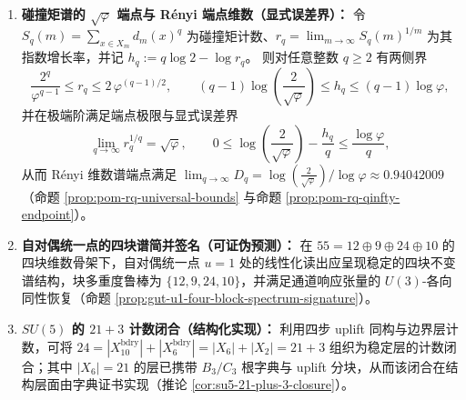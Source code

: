 \begin{theorem}
\begin{enumerate}
  \item \textbf{碰撞矩谱的 \texorpdfstring{$\sqrt{\varphi}$}{sqrt(phi)} 端点与 Rényi 端点维数（显式误差界）：}
  令 \(S_q(m)=\sum_{x\in X_m}d_m(x)^q\) 为碰撞矩计数、\(r_q=\lim_{m\to\infty}S_q(m)^{1/m}\) 为其指数增长率，并记 \(h_q:=q\log 2-\log r_q\)。
  则对任意整数 \(q\ge 2\) 有两侧界
  \[
  \frac{2^q}{\varphi^{q-1}}\le r_q\le 2\,\varphi^{(q-1)/2},
  \qquad
  (q-1)\log\!\left(\frac{2}{\sqrt{\varphi}}\right)\le h_q\le (q-1)\log\varphi,
  \]
  并在极端阶满足端点极限与显式误差界
  \[
  \lim_{q\to\infty} r_q^{1/q}=\sqrt{\varphi},\qquad
  0\le \log\!\left(\frac{2}{\sqrt{\varphi}}\right)-\frac{h_q}{q}\le \frac{\log\varphi}{q},
  \]
  从而 Rényi 维数谱端点满足
  \(
  \lim_{q\to\infty}D_q=\log\!\left(\frac{2}{\sqrt{\varphi}}\right)/\log\varphi\approx 0.94042009
  \)
  （命题 \ref{prop:pom-rq-universal-bounds} 与命题 \ref{prop:pom-rq-qinfty-endpoint}）。

  \item \textbf{自对偶统一点的四块谱简并签名（可证伪预测）：}
  在 \(55=12\oplus 9\oplus 24\oplus 10\) 的四块维数骨架下，自对偶统一点 \(u=1\) 处的线性化读出应呈现稳定的四块不变谱结构，块多重度鲁棒为 \(\{12,9,24,10\}\)，并满足通道响应张量的 \(U(3)\)-各向同性恢复（命题 \ref{prop:gut-u1-four-block-spectrum-signature}）。

  \item \textbf{\texorpdfstring{$SU(5)$}{SU(5)} 的 \(21+3\) 计数闭合（结构化实现）：}
  利用四步 uplift 同构与边界层计数，可将
  \(
  24=|X_{10}^{\mathrm{bdry}}|+|X_6^{\mathrm{bdry}}|
  =|X_6|+|X_2|=21+3
  \)
  组织为稳定层的计数闭合；其中 \(|X_6|=21\) 的层已携带 \(B_3/C_3\) 根字典与 uplift 分块，从而该闭合在结构层面由字典证书实现（推论 \ref{cor:su5-21-plus-3-closure}）。
\end{enumerate}
\end{theorem}

